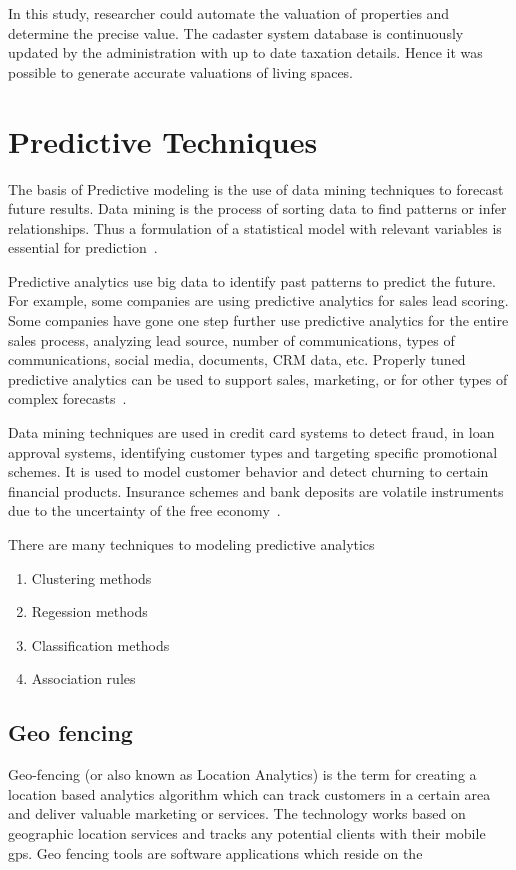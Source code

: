 In this study, researcher could automate the valuation of properties and determine the precise value. The cadaster system database is continuously updated by the administration with up to date taxation details. Hence it was possible to generate accurate valuations of living spaces.

%
%
%
%

\setlength{\footskip}{8mm}

\chapter{Predictive Techniques} 
\label{predictive-techniques}

The basis of Predictive modeling is the use of data mining techniques to forecast future results. Data mining is the process of sorting data to find patterns or infer relationships. Thus a formulation of a statistical model with relevant variables is essential for prediction~. 

Predictive analytics use big data to identify past patterns to predict the future. For example, some companies are using predictive analytics for sales lead scoring. Some companies have gone one step further use predictive analytics for the entire sales process, analyzing lead source, number of communications, types of communications, social media, documents, CRM data, etc. Properly tuned predictive analytics can be used to support sales, marketing, or for other types of complex forecasts~.

Data mining techniques are used in credit card systems to detect fraud, in loan approval systems, identifying customer types and targeting specific promotional schemes. It is used to model customer behavior and detect churning to certain financial products. Insurance schemes and bank deposits are volatile instruments due to the uncertainty of the free economy~.

There are many techniques to modeling predictive analytics 


\begin{enumerate}
	\item Clustering methods
	\item Regession methods
	\item Classification methods
	\item Association rules
\end{enumerate}

%
%
%
%
\section{Geo fencing}
Geo-fencing (or also known as Location Analytics) is the term for creating a location based analytics algorithm which can track customers in a certain area and deliver valuable marketing or services. The technology works based on geographic location services and tracks any potential clients with their mobile gps. 
Geo fencing tools are software applications which reside on the 

